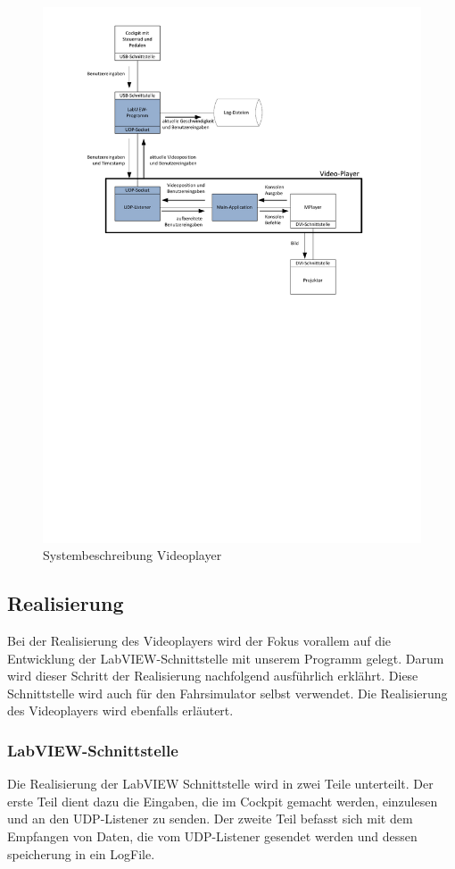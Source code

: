 \begin{figure}[H]
\centering 
\includegraphics[width=0.8\linewidth]{src/Systembeschreibung_VideoPlayer.pdf}
\caption{Systembeschreibung Videoplayer} %
\label{Systembeschreibung Videoplayer} %
\end{figure}

\subsection{Realisierung}
Bei der Realisierung des Videoplayers wird der Fokus vorallem auf die Entwicklung der LabVIEW-Schnittstelle mit unserem Programm gelegt. Darum wird dieser Schritt der Realisierung nachfolgend ausführlich erklährt. Diese Schnittstelle wird auch für den Fahrsimulator selbst verwendet. Die Realisierung des Videoplayers wird ebenfalls erläutert.

\subsubsection{LabVIEW-Schnittstelle}
\label{labview_schnittstelle}
Die Realisierung der LabVIEW Schnittstelle wird in zwei Teile unterteilt. Der erste Teil dient dazu die Eingaben, die im Cockpit gemacht werden, einzulesen und an den UDP-Listener zu senden. Der zweite Teil befasst sich mit dem Empfangen von Daten, die vom UDP-Listener gesendet werden und dessen speicherung in ein LogFile.

